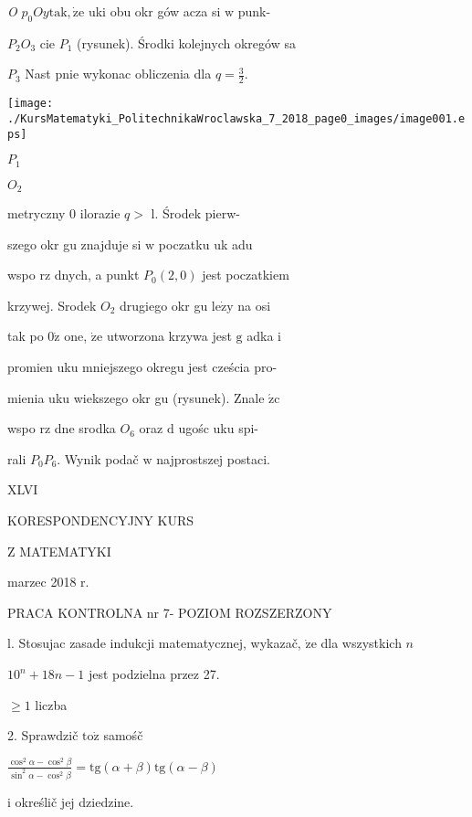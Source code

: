 \documentclass[a4paper,12pt]{article}
\begin{document}
{\it O} $p_{0} Oy \mathrm{t}\mathrm{a}\mathrm{k}, \dot{\mathrm{z}}\mathrm{e}$ uki obu okr gów acza si $\mathrm{w}$ punk-

$P_{2} O_{3}$ cie $P_{1}$ (rysunek). Środki kolejnych okregów sa

$P_{3}$ Nast pnie wykonac obliczenia dla $q=\displaystyle \frac{3}{2}.$
\begin{center}
\texttt{[image: ./KursMatematyki\_PolitechnikaWroclawska\_7\_2018\_page0\_images/image001.eps]}
\end{center}
$P_{1}$

$O_{2}$

metryczny $0$ ilorazie $q >$ l. Środek pierw-

szego okr gu znajduje si $\mathrm{w}$ poczatku uk adu

wspo rz dnych, a punkt $P_{0}(2,0)$ jest poczatkiem

krzywej. Srodek $O_{2}$ drugiego okr gu $\mathrm{l}\mathrm{e}\dot{\mathrm{z}}\mathrm{y}$ na osi

tak po $0\dot{\mathrm{z}}$ one, $\dot{\mathrm{z}}\mathrm{e}$ utworzona krzywa jest $\mathrm{g}$ adka $\mathrm{i}$

promien uku mniejszego okregu jest cześcia pro-

mienia uku wiekszego okr gu (rysunek). Znale $\acute{\mathrm{z}}\mathrm{c}$

wspo rz dne srodka $O_{6}$ oraz $\mathrm{d}$ ugośc uku spi-

rali $P_{0}P_{6}$. Wynik podač $\mathrm{w}$ najprostszej postaci.




XLVI

KORESPONDENCYJNY KURS

Z MATEMATYKI

marzec 2018 r.

PRACA KONTROLNA nr 7- POZIOM ROZSZERZONY

l. Stosujac zasade indukcji matematycznej, wykazač, $\dot{\mathrm{z}}\mathrm{e}$ dla wszystkich $n$

$10^{n}+18n-1$ jest podzielna przez 27.

$\geq 1$ liczba

2. Sprawdzič $\mathrm{t}\mathrm{o}\dot{\mathrm{z}}$ samośč

$\displaystyle \frac{\cos^{2}\alpha-\cos^{2}\beta}{\sin^{2}\alpha-\cos^{2}\beta}=\mathrm{t}\mathrm{g}(\alpha+\beta)\mathrm{t}\mathrm{g}(\alpha-\beta)$

$\mathrm{i}$ określič jej dziedzine.
\end{document}

